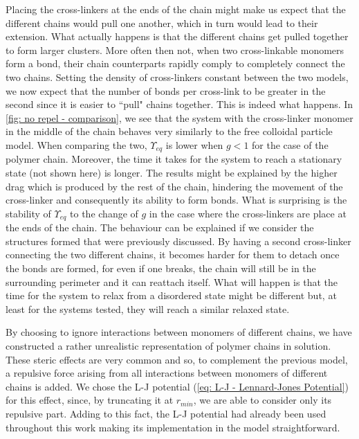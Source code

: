 \documentclass[../../main.tex]{subfiles}
\begin{document}
    Placing the cross-linkers at the ends of the chain might make us expect that the different chains would pull one another, which in turn would lead to their extension. What actually happens is that the different chains get pulled together to form larger clusters. More often then not, when two cross-linkable monomers form a bond, their chain counterparts rapidly comply to completely connect the two chains. Setting the density of cross-linkers constant between the two models, we now expect that the number of bonds per cross-link to be greater in the second since it is easier to ``pull" chains together. This is indeed what happens. In \cref{fig: no repel - comparison}, we see that the system with the cross-linker monomer in the middle of the chain behaves very similarly to the free colloidal particle model. When comparing the two, $\Upsilon_{eq}$ is lower when $g<1$ for the case of the polymer chain. Moreover, the time it takes for the system to reach a stationary state (not shown here) is longer. The results might be explained by the higher drag which is produced by the rest of the chain, hindering the movement of the cross-linker and consequently its ability to form bonds. What is surprising is the stability of $\Upsilon_{eq}$ to the change of $g$ in the case where the cross-linkers are place at the ends of the chain. The behaviour can be explained if we consider the structures formed that were previously discussed. By having a second cross-linker connecting the two different chains, it becomes harder for them to detach once the bonds are formed, for even if one breaks, the chain will still be in the surrounding perimeter and it can reattach itself. What will happen is that the time for the system to relax from a disordered state might be different but, at least for the systems tested, they will reach a similar relaxed state.

    
    By choosing to ignore interactions between monomers of different chains, we have constructed a rather unrealistic representation of polymer chains in solution. These steric effects are very common and so, to complement the previous model, a repulsive force arising from all interactions between monomers of different chains is added. We chose the L-J potential (\cref{eq: L-J - Lennard-Jones Potential}) for this effect, since, by truncating it at $r_{min}$, we are able to consider only its repulsive part. Adding to this fact, the L-J potential had already been used throughout this work making its implementation in the model straightforward.
    
\end{document}
